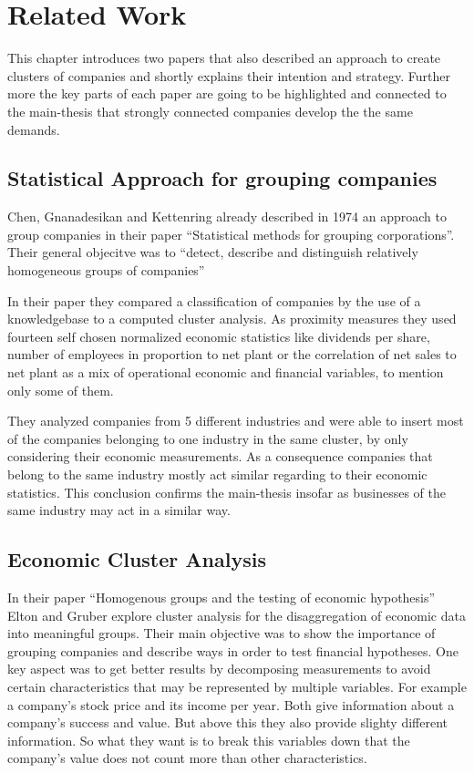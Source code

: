 \section{Related Work}

This chapter introduces two papers that also described an approach to create clusters of companies and
shortly explains their intention and strategy. Further more the key parts of each paper are going to be
highlighted and connected to the main-thesis that strongly connected companies develop the the same demands.

\subsection{Statistical Approach for grouping companies}

Chen, Gnanadesikan and Kettenring \cite{StatisticalGrouping} already described in 1974 an approach to group companies in
their paper ``Statistical methods for grouping corporations''. Their general objecitve was to ``detect, describe and
distinguish relatively homogeneous groups of companies''

In their paper they compared a classification of companies by the use of a knowledgebase to a computed cluster analysis.
As proximity measures they used fourteen self chosen normalized economic statistics like dividends per share, number of employees in proportion
to net plant or the correlation of net sales to net plant as a mix of operational economic and financial variables, to mention only some of them.

They analyzed companies from 5 different industries and were able to insert most of the companies belonging to one industry in the same cluster, by only
considering their economic measurements. As a consequence companies that belong to the same industry mostly act similar
regarding to their economic statistics. This conclusion confirms the main-thesis insofar as businesses of the same industry
may act in a similar way.

\subsection{Economic Cluster Analysis}

In their paper ``Homogenous groups and the testing of economic hypothesis'' Elton and Gruber \cite{EconomicClusterAnalysis}
explore cluster analysis for the disaggregation of economic data into meaningful groups. Their main objective was to
show the importance of grouping companies and describe ways in order to test financial hypotheses.
One key aspect was to get better results by decomposing measurements to avoid certain characteristics that may
be represented by multiple variables. For example a company's stock price and its income per year. Both give information
about a company's success and value. But above this they also provide slighty different information. So what they want
is to break this variables down that the company's value does not count more than other characteristics.

